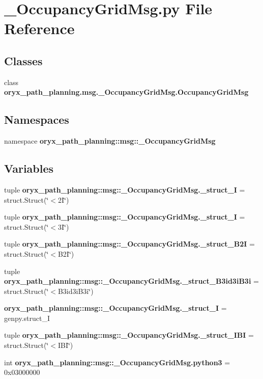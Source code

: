 \section{\-\_\-\-Occupancy\-Grid\-Msg.\-py \-File \-Reference}
\label{__OccupancyGridMsg_8py}
\subsection*{\-Classes}
\begin{DoxyCompactItemize}
\item 
class {\bf oryx\-\_\-path\-\_\-planning.\-msg.\-\_\-\-Occupancy\-Grid\-Msg.\-Occupancy\-Grid\-Msg}
\end{DoxyCompactItemize}
\subsection*{\-Namespaces}
\begin{DoxyCompactItemize}
\item 
namespace {\bf oryx\-\_\-path\-\_\-planning\-::msg\-::\-\_\-\-Occupancy\-Grid\-Msg}
\end{DoxyCompactItemize}
\subsection*{\-Variables}
\begin{DoxyCompactItemize}
\item 
tuple {\bf oryx\-\_\-path\-\_\-planning\-::msg\-::\-\_\-\-Occupancy\-Grid\-Msg.\-\_\-struct\-\_\-I} = struct.\-Struct(\char`\"{}$<$2\-I\char`\"{})
\item 
tuple {\bf oryx\-\_\-path\-\_\-planning\-::msg\-::\-\_\-\-Occupancy\-Grid\-Msg.\-\_\-struct\-\_\-I} = struct.\-Struct(\char`\"{}$<$3\-I\char`\"{})
\item 
tuple {\bf oryx\-\_\-path\-\_\-planning\-::msg\-::\-\_\-\-Occupancy\-Grid\-Msg.\-\_\-struct\-\_\-\-B2\-I} = struct.\-Struct(\char`\"{}$<$\-B2\-I\char`\"{})
\item 
tuple {\bf oryx\-\_\-path\-\_\-planning\-::msg\-::\-\_\-\-Occupancy\-Grid\-Msg.\-\_\-struct\-\_\-\-B3id3i\-B3i} = struct.\-Struct(\char`\"{}$<$\-B3id3i\-B3i\char`\"{})
\item 
{\bf oryx\-\_\-path\-\_\-planning\-::msg\-::\-\_\-\-Occupancy\-Grid\-Msg.\-\_\-struct\-\_\-\-I} = genpy.\-struct\-\_\-\-I
\item 
tuple {\bf oryx\-\_\-path\-\_\-planning\-::msg\-::\-\_\-\-Occupancy\-Grid\-Msg.\-\_\-struct\-\_\-\-I\-B\-I} = struct.\-Struct(\char`\"{}$<$\-I\-B\-I\char`\"{})
\item 
int {\bf oryx\-\_\-path\-\_\-planning\-::msg\-::\-\_\-\-Occupancy\-Grid\-Msg.\-python3} = 0x03000000
\end{DoxyCompactItemize}
